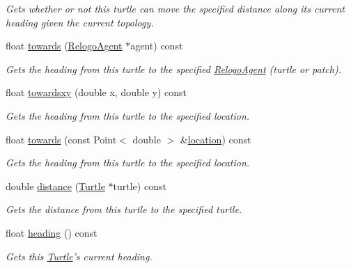 \begin{DoxyCompactItemize}
\begin{DoxyCompactList}\small\item\em Gets whether or not this turtle can move the specified distance along its current heading given the current topology. \end{DoxyCompactList}\item 
float \hyperlink{classrepast_1_1relogo_1_1_turtle_a750aa7d0eba9818a5644c392e9eb3149}{towards} (\hyperlink{classrepast_1_1relogo_1_1_relogo_agent}{Relogo\-Agent} $\ast$agent) const 
\begin{DoxyCompactList}\small\item\em Gets the heading from this turtle to the specified \hyperlink{classrepast_1_1relogo_1_1_relogo_agent}{Relogo\-Agent} (turtle or patch). \end{DoxyCompactList}\item 
float \hyperlink{classrepast_1_1relogo_1_1_turtle_a843809bcaa67d5194f29d457f4d3fd05}{towardsxy} (double x, double y) const 
\begin{DoxyCompactList}\small\item\em Gets the heading from this turtle to the specified location. \end{DoxyCompactList}\item 
float \hyperlink{classrepast_1_1relogo_1_1_turtle_a39aaad16a3789cead666b18e9b0e7fd0}{towards} (const Point$<$ double $>$ \&\hyperlink{classrepast_1_1relogo_1_1_relogo_agent_a12632fc6c21f34dc1552a1d46d7d1000}{location}) const 
\begin{DoxyCompactList}\small\item\em Gets the heading from this turtle to the specified location. \end{DoxyCompactList}\item 
double \hyperlink{classrepast_1_1relogo_1_1_turtle_af1f309528154fa89567e4c4e7b6660b6}{distance} (\hyperlink{classrepast_1_1relogo_1_1_turtle}{Turtle} $\ast$turtle) const 
\begin{DoxyCompactList}\small\item\em Gets the distance from this turtle to the specified turtle. \end{DoxyCompactList}\item 
float \hyperlink{classrepast_1_1relogo_1_1_turtle_abd3ddfba05fb41d8b39ea8684352c8d4}{heading} () const 
\begin{DoxyCompactList}\small\item\em Gets this \hyperlink{classrepast_1_1relogo_1_1_turtle}{Turtle}'s current heading. \end{DoxyCompactList}\item 

\end{DoxyCompactItemize}
